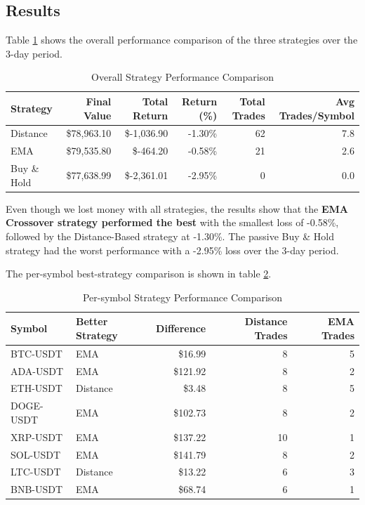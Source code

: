 \documentclass{article}
\begin{document}
\subsection{Results}
Table \ref{tab:strategy-performance} shows the overall performance comparison of the three strategies 
over the 3-day period.

\begin{table}[H]
    \centering
    \begin{tabular}{|l|r|r|r|r|r|}
        \hline
        \textbf{Strategy} & \textbf{Final Value} & \textbf{Total Return} & \textbf{Return (\%)} & \textbf{Total Trades} & \textbf{Avg Trades/Symbol} \\
        \hline
        Distance & \$78,963.10 & \$-1,036.90 & -1.30\% & 62 & 7.8 \\
        \hline
        EMA & \$79,535.80 & \$-464.20 & -0.58\% & 21 & 2.6 \\
        \hline
        Buy \& Hold & \$77,638.99 & \$-2,361.01 & -2.95\% & 0 & 0.0 \\
        \hline
    \end{tabular}
    \caption{Overall Strategy Performance Comparison}
    \label{tab:strategy-performance}
\end{table}

Even though we lost money with all strategies, the results show that the 
\textbf{EMA Crossover strategy performed the best} with the smallest loss of -0.58\%, 
followed by the Distance-Based strategy at -1.30\%. The passive Buy \& Hold strategy had the worst 
performance with a -2.95\% loss over the 3-day period.

The per-symbol best-strategy comparison is shown in table \ref{tab:strategy-performance-symbols}.

\begin{table}[H]
    \centering
    \begin{tabular}{|l|l|r|r|r|}
        \hline
        \textbf{Symbol} & \textbf{Better Strategy} & \textbf{Difference} & \textbf{Distance Trades} & \textbf{EMA Trades} \\
        \hline
        BTC-USDT & EMA & \$16.99 & 8 & 5 \\
        \hline
        ADA-USDT & EMA & \$121.92 & 8 & 2 \\
        \hline
        ETH-USDT & Distance & \$3.48 & 8 & 5 \\
        \hline
        DOGE-USDT & EMA & \$102.73 & 8 & 2 \\
        \hline
        XRP-USDT & EMA & \$137.22 & 10 & 1 \\
        \hline
        SOL-USDT & EMA & \$141.79 & 8 & 2 \\
        \hline
        LTC-USDT & Distance & \$13.22 & 6 & 3 \\
        \hline
        BNB-USDT & EMA & \$68.74 & 6 & 1 \\
        \hline
    \end{tabular}
    \caption{Per-symbol Strategy Performance Comparison}
    \label{tab:strategy-performance-symbols}
\end{table}
\end{document}
